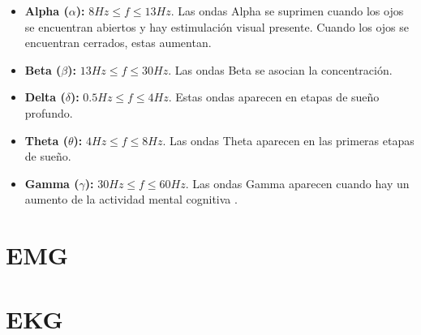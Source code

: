 \begin{itemize}
 \item \textbf{Alpha ($\alpha$):} $ 8 Hz \leq f \leq 13 Hz$. Las ondas Alpha se suprimen cuando los ojos se encuentran abiertos y hay estimulación visual presente. Cuando los ojos se encuentran cerrados, estas aumentan.
 \item \textbf{Beta ($\beta$):} $ 13 Hz \leq f \leq 30 Hz$. Las ondas Beta se asocian la concentración.
 \item \textbf{Delta ($\delta$):} $ 0.5 Hz \leq f \leq 4 Hz$. Estas ondas aparecen en etapas de sueño profundo.
 \item \textbf{Theta ($\theta$):} $ 4 Hz \leq f \leq 8 Hz$. Las ondas Theta aparecen en las primeras etapas de sueño.
 \item \textbf{Gamma ($\gamma$):} $ 30 Hz \leq f \leq 60 Hz$. Las ondas Gamma aparecen cuando hay un aumento de la actividad mental cognitiva \cite{neural-eng}.
\end{itemize}

\section{EMG}

\section{EKG}